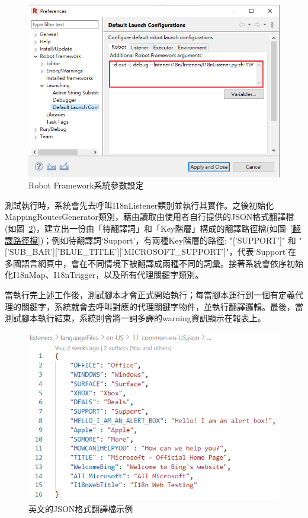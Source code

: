 \begin{figure}[H]
    \includegraphics[width= 1.1\textwidth]{../論文截圖/3-1-3-1 設定系統參數.png}
    \caption{Robot Framework系統參數設定}
    \label{rfSysArgsSetting}
\end{figure}
測試執行時，系統會先去呼叫I18nListener類別並執行其實作。之後初始化MappingRoutesGenerator類別，藉由讀取由使用者自行提供的JSON格式翻譯檔(如圖~\ref{英文的JSON格式翻譯檔示例})，建立出一份由「待翻譯詞」和「Key階層」構成的翻譯路徑檔(如圖~\ref{翻譯路徑檔})；例如待翻譯詞‘Support’，有兩種Key階層的路徑: "['SUPPORT']" 和 "['SUB\_BAR']['BLUE\_TITLE']['MICROSOFT\_SUPPORT']"，代表‘Support’在多國語言網頁中，會在不同情境下被翻譯成兩種不同的詞彙。接著系統會依序初始化I18nMap、I18nTrigger，以及所有代理關鍵字類別。

當執行完上述工作後，測試腳本才會正式開始執行；每當腳本運行到一個有定義代理的關鍵字，系統就會去呼叫對應的代理關鍵字物件，並執行翻譯邏輯。最後，當測試腳本執行結束，系統則會將一詞多譯的warning資訊顯示在報表上。

\begin{figure}[H]
    \includegraphics[width= 1.1\textwidth]{../論文截圖/3-1-3-2 JSON格式翻譯檔.png}
    \caption{英文的JSON格式翻譯檔示例}
    \label{英文的JSON格式翻譯檔示例}
\end{figure}

